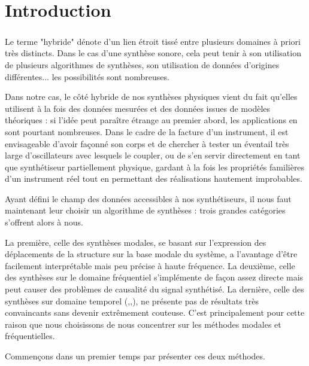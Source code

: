 \chapter*{Introduction}

\paragraph*{}
Le terme "hybride" dénote d'un lien étroit tissé entre plusieurs domaines à priori très distincts. Dans le cas d'une synthèse sonore, cela peut tenir à son utilisation de plusieurs algorithmes de synthèses, son utilisation de données d'origines différentes... les possibilités sont nombreuses.

Dans notre cas, le côté hybride de nos synthèses physiques vient du fait qu'elles utilisent à la fois des données mesurées et des données issues de modèles théoriques : si l'idée peut paraître étrange au premier abord, les applications en sont pourtant nombreuses. Dans le cadre de la facture d'un instrument, il est envisageable d'avoir façonné son corps et de chercher à tester un éventail très large d'oscillateurs avec lesquels le coupler, ou de s'en servir directement en tant que synthétiseur partiellement physique, gardant à la fois les propriétés familières d'un instrument réel tout en permettant des réalisations hautement improbables.

Ayant défini le champ des données accessibles à nos synthétiseurs, il nous faut maintenant leur choisir un algorithme de synthèses : trois grandes catégories s'offrent alors à nous.

La première, celle des synthèses modales, se basant sur l'expression des déplacements de la structure sur la base modale du système, a l'avantage d'être facilement interprétable mais peu précise à haute fréquence.
La deuxième, celle des synthèses sur le domaine fréquentiel s'implémente de façon assez directe mais peut causer des problèmes de causalité du signal synthétisé. La dernière, celle des synthèses sur domaine temporel (\cite{karplus1983digital},\cite{smith1987music},\cite{bensa2003simulation}), ne présente pas de résultats très convaincants sans devenir extrêmement couteuse.
C'est principalement pour cette raison que nous choisissons de nous concentrer sur les méthodes modales et fréquentielles.

Commençons dans un premier temps par présenter ces deux méthodes.